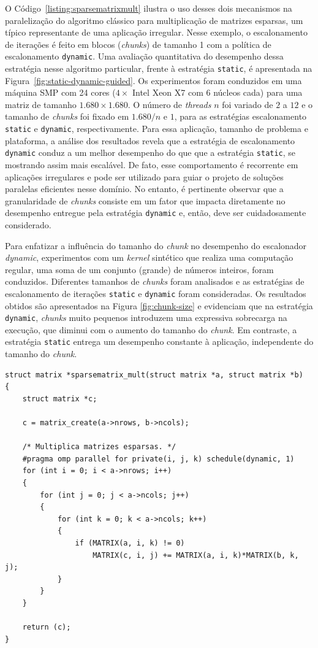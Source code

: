 \documentclass{SBCbookchapter}
\begin{document}
		O Código~\ref{listing:sparsematrixmult} ilustra o uso desses dois
		mecanismos na paralelização do algoritmo clássico para multiplicação
		de matrizes esparsas, um típico representante de uma aplicação
		irregular. Nesse exemplo, o escalonamento de iterações é feito em
		blocos (\textit{chunks}) de tamanho 1 com a política de
		escalonamento \texttt{dynamic}. Uma avaliação quantitativa do
		desempenho dessa estratégia nesse algoritmo particular, frente à
		estratégia \texttt{static}, é apresentada na
		Figura~\ref{fig:static-dynamic-guided}. Os experimentos foram
		conduzidos em uma máquina SMP com 24 cores ($4 \times$ Intel Xeon
		X7 com 6 núcleos cada) para uma matriz de tamanho $1.680 \times 1.680$. 
		O número de \textit{threads} $n$ foi variado de $2$ a $12$ e o tamanho de
		\textit{chunks} foi fixado em $1.680/n$ e $1$, para as estratégias
		escalonamento \texttt{static} e \texttt{dynamic}, respectivamente.
		Para essa aplicação, tamanho de problema e plataforma, a análise dos
		resultados revela que a estratégia de escalonamento \texttt{dynamic}
		conduz a um melhor desempenho do que que a estratégia
		\texttt{static}, se mostrando assim mais escalável.  De fato, esse
		comportamento é recorrente em aplicações irregulares e pode ser
		utilizado para guiar o projeto de soluções paralelas eficientes
		nesse domínio. No entanto, é pertinente observar que a
		granularidade de \textit{chunks} consiste em um fator que impacta
		diretamente no desempenho entregue pela estratégia \texttt{dynamic}
		e, então, deve ser cuidadosamente considerado. 

		Para enfatizar a influência do tamanho do \textit{chunk} no
		desempenho do escalonador \textit{dynamic}, experimentos com um
		\textit{kernel} sintético que realiza uma computação regular,
		uma soma de um conjunto (grande) de números inteiros, foram
		conduzidos. Diferentes tamanhos de \textit{chunks} foram
		analisados e as estratégias de escalonamento de iterações
		\texttt{static} e \texttt{dynamic} foram consideradas. Os
		resultados obtidos são apresentados na Figura \ref{fig:chunk-size}
		e evidenciam que na estratégia \texttt{dynamic},
		\textit{chunks} muito pequenos introduzem uma expressiva
		sobrecarga na execução, que diminui com o aumento do tamanho do
		\textit{chunk}. Em contraste, a estratégia \texttt{static}
		entrega um desempenho constante à aplicação, independente do
		tamanho do \textit{chunk}.

\begin{lstlisting}[frame=single, caption=Exemplo de multiplicação de matrizes esparsas.,
label=listing:sparsematrixmult]
struct matrix *sparsematrix_mult(struct matrix *a, struct matrix *b)
{
	struct matrix *c;

	c = matrix_create(a->nrows, b->ncols);

	/* Multiplica matrizes esparsas. */
	#pragma omp parallel for private(i, j, k) schedule(dynamic, 1)
	for (int i = 0; i < a->nrows; i++)
	{
		for (int j = 0; j < a->ncols; j++)
		{
			for (int k = 0; k < a->ncols; k++)
			{
				if (MATRIX(a, i, k) != 0)
					MATRIX(c, i, j) += MATRIX(a, i, k)*MATRIX(b, k, j);
			}
		}
	}

	return (c);
}
\end{lstlisting}
\end{document}
